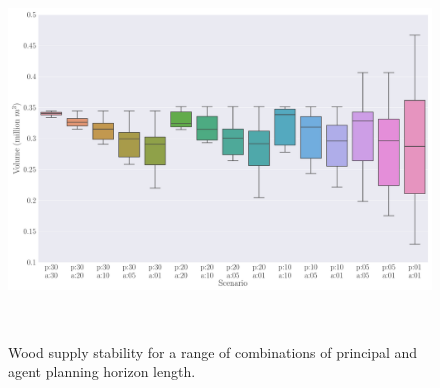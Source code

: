 

\begin{figure}[H]
  \centering
  \includegraphics[height=10cm]{images/boxplots_series1}
  \caption{Wood supply stability for a range of combinations of principal and agent planning horizon length. }
  \label{fig:scenario_series_1}
\end{figure}




